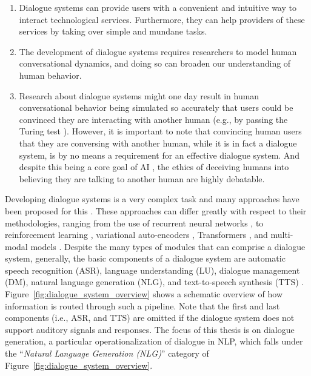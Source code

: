 \begin{enumerate}
    \item Dialogue systems can provide users with a convenient and intuitive way to interact technological services. Furthermore, they can help providers of these services by taking over simple and mundane tasks.
    \item The development of dialogue systems requires researchers to model human conversational dynamics, and doing so can broaden our understanding of human behavior.
    \item Research about dialogue systems might one day result in human conversational behavior being simulated so accurately that users could be convinced they are interacting with another human (e.g., by passing the Turing test \citep{oppy2003turing}). However, it is important to note that convincing human users that they are conversing with another human, while it is in fact a dialogue system, is by no means a requirement for an effective dialogue system. And despite this being a core goal of AI \citep{zheng2019personalized}, the ethics of deceiving humans into believing they are talking to another human are highly debatable.
\end{enumerate}

Developing dialogue systems is a very complex task and many approaches have been proposed for this \citep{mctear2020conversational}.
These approaches can differ greatly with respect to their methodologies, ranging from the use of recurrent neural networks \citep{li-etal-2016-deep}, to reinforcement learning \citep{mo2018personalizing}, variational auto-encoders \citep{ruan2019condition}, Transformers \citep{madotto-etal-2020-plug}, and multi-modal models \citep{shuster-etal-2021-multi}.
Despite the many types of modules that can comprise a dialogue system, generally, the basic components of a dialogue system are automatic speech recognition (ASR), language understanding (LU), dialogue management (DM), natural language generation (NLG), and text-to-speech synthesis (TTS) \citep{chen-etal-2017-deep}. Figure~\ref{fig:dialogue_system_overview} shows a schematic overview of how information is routed through such a pipeline. Note that the first and last components (i.e., ASR, and TTS) are omitted if the dialogue system does not support auditory signals and responses. The focus of this thesis is on dialogue generation, a particular operationalization of dialogue in NLP, which falls under the ``\textit{Natural Language Generation (NLG)}'' category of Figure~\ref{fig:dialogue_system_overview}.

